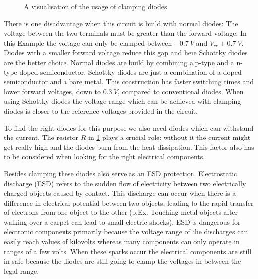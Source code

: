 \begin{figure}[htb]
	\centering
	\caption{A visualisation of the usage of clamping diodes}
	\label{fig:clamping-diodes}
\end{figure}

There is one disadvantage when this circuit is build with normal diodes: The voltage between the two terminals must be greater than the forward voltage. In this Example the voltage can only be clamped between $\SI{-0,7}{V}$ and $V_{cc} + \SI{0,7}{V}$. Diodes with a smaller forward voltage reduce this gap and here Schottky diodes are the better choice. Normal diodes are build by combining a p-type and a n-type doped semiconductor. Schottky diodes are just a combination of a doped semiconductor and a bare metal. This construction has faster switching times and lower forward voltages, down to $\SI{0,3}{V}$, compared to conventional diodes. When using Schottky diodes the voltage range which can be achieved with clamping diodes is closer to the reference voltages provided in the circuit.

To find the right diodes for this purpose we also need diodes which can withstand the current. The resistor $R$ in \cref{fig:clamping-diodes} plays a crucial role: without it the current might get really high and the diodes burn from the heat dissipation. This factor also has to be considered when looking for the right electrical components.

Besides clamping these diodes also serve as an ESD protection. Electrostatic discharge (ESD) refers to the sudden flow of electricity between two electrically charged objects caused by contact. This discharge can occur when there is a difference in electrical potential between two objects, leading to the rapid transfer of electrons from one object to the other (p.Ex. Touching metal objects after walking over a carpet can lead to small electric shocks). ESD is dangerous for electronic components primarily because the voltage range of the discharges can easily reach values of kilovolts whereas many components can only operate in ranges of a few volts. When these sparks occur the electrical components are still in safe because the diodes are still going to clamp the voltages in between the legal range.


